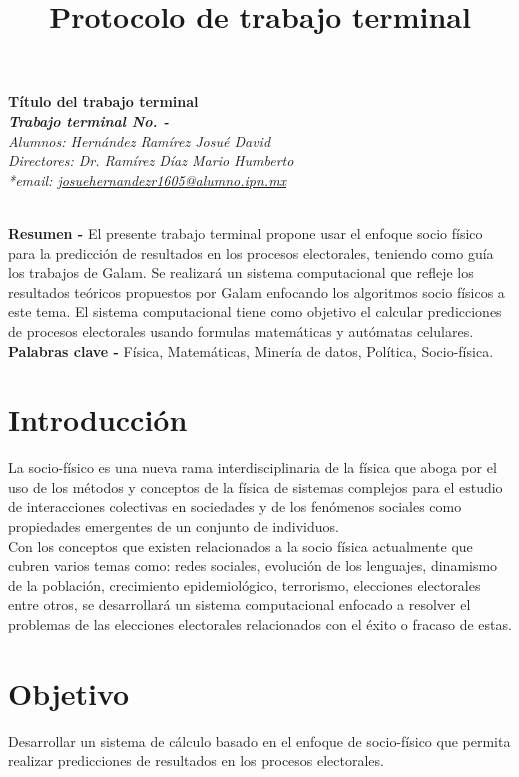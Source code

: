 \documentclass[letterpaper, 10pt]{article}
\title{Protocolo de trabajo terminal}
\def\letra#1#2{%
\tamanyo=#1%
\interlinea=1.2\tamanyo%
\fontfamily{ptm}
\fontsize{\the\tamanyo}%
{\the\interlinea}\selectfont#2}
\begin{document}
\begin{center}
    \letra{14pt}{\textbf{Título del trabajo terminal}} \\
    \letra{12pt}{\textbf{\textit{Trabajo terminal No. -}}} \\
    \letra{12pt}{\textit{Alumnos: Hernández Ramírez Josué David}} \\
    \letra{12pt}{\textit{Directores: Dr. Ramírez Díaz Mario Humberto}} \\
    \letra{12pt}{\textit{*email: \url{josuehernandezr1605@alumno.ipn.mx}}}
\end{center}
\\
\textbf{Resumen -} El presente trabajo terminal propone usar el enfoque socio físico para la predicción de resultados en los procesos electorales, teniendo como guía los trabajos de Galam. Se realizará un sistema computacional que refleje los resultados teóricos propuestos por Galam enfocando los algoritmos socio físicos a este tema. El sistema computacional tiene como objetivo el calcular predicciones de procesos electorales usando formulas matemáticas y autómatas celulares.
\newline
\newline
\textbf{Palabras clave -} Física, Matemáticas, Minería de datos, Política, Socio-física.

\section{Introducción}

La socio-físico es una nueva rama interdisciplinaria de la física que aboga por el uso de los métodos y conceptos de la física de sistemas complejos para el estudio de interacciones colectivas en sociedades y de los fenómenos sociales como propiedades emergentes de un conjunto de individuos. \cite{MarioH.RamirezDiaz2014}
\vspace{5mm} %
\\
Con los conceptos que existen relacionados a la socio física actualmente que cubren varios temas como: redes sociales, evolución de los lenguajes, dinamismo de la población, crecimiento epidemiológico, terrorismo, elecciones electorales entre otros, se desarrollará un sistema computacional enfocado a resolver el problemas de las elecciones electorales relacionados con el éxito o fracaso de estas.

\section{Objetivo}
Desarrollar un sistema de cálculo basado en el enfoque de socio-físico que permita realizar predicciones de resultados en los procesos electorales. 
\end{document}
